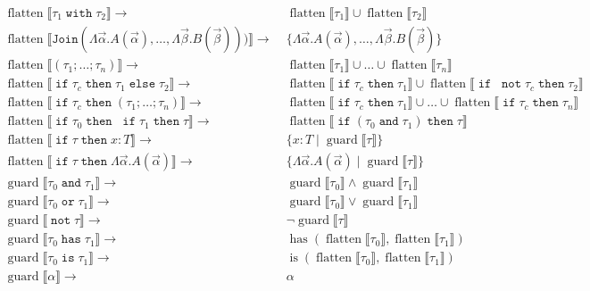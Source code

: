 \documentclass[10pt]{article}
\def\denot#1{{\llbracket #1 \rrbracket}}
\newcommand\SumType{\texttt{Join}}
\newcommand\Tif{\mathrel{\texttt{if}}}
\newcommand\Tnot{\mathrel{\texttt{not}}}
\newcommand\Tand{\mathrel{\texttt{and}}}
\newcommand\Tor{\mathrel{\texttt{or}}}
\newcommand\Tthen{\mathrel{\texttt{then}}}
\newcommand\Telse{\mathrel{\texttt{else}}}
\newcommand\Twith{\mathrel{\texttt{with}}}
\newcommand\Thas{\mathrel{\texttt{has}}}
\newcommand\Tis{\mathrel{\texttt{is}}}
\newcommand\Mflatten{\mathop{flatten}}
\newcommand\Mguard{\mathop{guard}}
\newcommand\Mhas{\mathop{has}}
\newcommand\Mis{\mathop{is}}
\newcommand\Mif{\mathrel{|}}
\begin{document}
\begin{minipage}{\textwidth}
  \begin{align*}
    \Mflatten \denot{\tau_1 \Twith \tau_2} \rightarrow &\;
      \Mflatten \denot{\tau_1} \cup \Mflatten \denot{\tau_2}
    \\
    \Mflatten \denot{\SumType(
      \Lambda \vec{\alpha}. A(\vec{\alpha}), \ldots,
      \Lambda \vec{\beta}.  B(\vec{\beta})))}
    \rightarrow &\;
      \{ \Lambda \vec{\alpha}. A(\vec{\alpha}), \ldots,
         \Lambda \vec{\beta}. B(\vec{\beta}) \}
    \\
    \Mflatten \denot{(\tau_1; \ldots; \tau_n)} \rightarrow &\;
      \Mflatten \denot{\tau_1} \cup \ldots \cup \Mflatten \denot{\tau_n}
    \\
    \Mflatten \denot{\Tif \tau_c \Tthen \tau_1 \Telse \tau_2}
    \rightarrow &\;
      \Mflatten \denot{\Tif \tau_c \Tthen \tau_1} \cup
      \Mflatten \denot{\Tif\;\Tnot \tau_c \Tthen \tau_2}
    \\
    \Mflatten \denot{\Tif \tau_c \Tthen (\tau_1; \ldots; \tau_n)}
    \rightarrow &\;
      \Mflatten \denot{\Tif \tau_c \Tthen \tau_1} \cup \ldots \cup
      \Mflatten \denot{\Tif \tau_c \Tthen \tau_n}
    \\
    \Mflatten \denot{\Tif \tau_0 \Tthen\;\Tif \tau_1 \Tthen \tau}
    \rightarrow &\;
      \Mflatten \denot{\Tif (\tau_0 \Tand \tau_1) \Tthen \tau}
    \\
    \Mflatten \denot{\Tif \tau \Tthen x : T}
    \rightarrow &\; \{ x : T \Mif \Mguard \denot{\tau} \}
    \\
    \Mflatten \denot{\Tif \tau \Tthen \Lambda \vec{\alpha}. A(\vec{\alpha})}
    \rightarrow &\;
    \{\Lambda \vec{\alpha}. A(\vec{\alpha}) \Mif \Mguard \denot{\tau} \}
    \\[0.5em]
    \Mguard \denot{\tau_0 \Tand \tau_1}
    \rightarrow &\;
      \Mguard \denot{\tau_0} \wedge \Mguard \denot{\tau_1}
    \\
    \Mguard \denot{\tau_0 \Tor \tau_1}
    \rightarrow &\;
      \Mguard \denot{\tau_0} \vee \Mguard \denot{\tau_1}
    \\
    \Mguard \denot{\Tnot \tau}
    \rightarrow &\;
      \neg \Mguard \denot{\tau}
    \\
    \Mguard \denot{\tau_0 \Thas \tau_1}
    \rightarrow &\;
      \Mhas (\Mflatten \denot{\tau_0}, \Mflatten \denot{\tau_1})
    \\
    \Mguard \denot{\tau_0 \Tis \tau_1}
    \rightarrow &\;
      \Mis (\Mflatten \denot{\tau_0}, \Mflatten \denot{\tau_1})
    \\
    \Mguard \denot{\alpha} \rightarrow &\; \alpha
    \\
  \end{align*}
\end{minipage}
\end{document}
